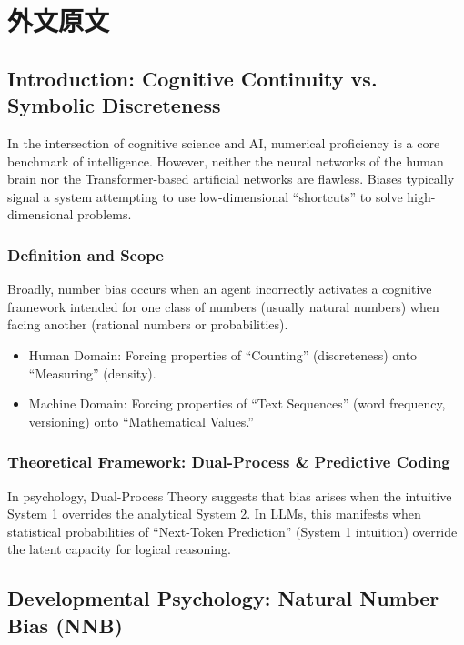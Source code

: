 \cleardoublepage
\chapter{外文原文}

\section{Introduction: Cognitive Continuity vs. Symbolic Discreteness}

In the intersection of cognitive science and AI, numerical proficiency is a core benchmark of intelligence. However, neither the neural networks of the human brain nor the Transformer-based artificial networks are flawless. Biases typically signal a system attempting to use low-dimensional “shortcuts” to solve high-dimensional problems.

\subsection{Definition and Scope}

Broadly, number bias occurs when an agent incorrectly activates a cognitive framework intended for one class of numbers (usually natural numbers) when facing another (rational numbers or probabilities).
\begin{itemize}
    \item Human Domain: Forcing properties of “Counting” (discreteness) onto “Measuring” (density).
    \item Machine Domain: Forcing properties of “Text Sequences” (word frequency, versioning) onto “Mathematical Values.”
\end{itemize}

\subsection{Theoretical Framework: Dual-Process \& Predictive Coding}

In psychology, Dual-Process Theory suggests that bias arises when the intuitive System 1 overrides the analytical System 2. In LLMs, this manifests when statistical probabilities of “Next-Token Prediction” (System 1 intuition) override the latent capacity for logical reasoning.

\section{Developmental Psychology: Natural Number Bias (NNB)}

